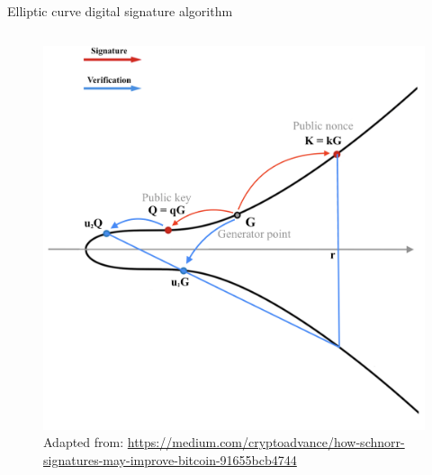 \documentclass[slidescentered]{beamer}
\newcommand{\source}[1]{\caption*{\tiny Adapted from: {#1}} }
\begin{document}
\begin{frame}{Elliptic curve digital signature algorithm}
\begin{columns}
\begin{column}{0.5\linewidth}
\begin{figure}
{						\source{\tiny \url{https://medium.com/cryptoadvance/how-schnorr-signatures-may-improve-bitcoin-91655bcb4744}}}
					 {\vspace*{-0.7cm}
						\hspace*{-1.7cm}
						\includegraphics[scale=0.29]{images/ECDSA7}
						\source{\tiny \url{https://medium.com/cryptoadvance/how-schnorr-signatures-may-improve-bitcoin-91655bcb4744}}}
				\end{figure}
			\end{column}
		\end{columns}
	\end{frame}
	
\end{document}
